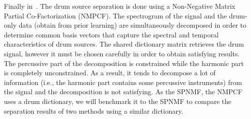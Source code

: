 Finally in~\cite{kim2011nonnegative}. The drum source separation is done using a Non-Negative Matrix Partial Co-Factorization (NMPCF). The spectrogram of the signal and the drum-only data (obtain from prior learning) are simultaneously decomposed in order to determine common basis vectors that capture the spectral and temporal characteristics of drum sources. The shared dictionary matrix retrieves the drum signal, however it must be chosen carefully in order to obtain satisfying results. The percussive part of the decomposition is constrained while the harmonic part is completely unconstrained. As a result, it tends to decompose a lot of information (i.e., the harmonic part contains some percussive instruments) from the signal and the decomposition is not satisfying. As the SPNMF, the NMPCF uses a drum dictionary, we will benchmark it to the SPNMF to compare the separation results of two methods using a similar dictionary. 
